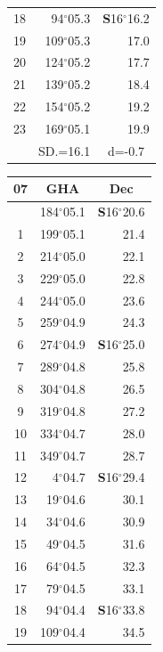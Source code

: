 \documentclass[10pt, a4paper]{report}
\begin{document}
\begin{scriptsize}
\begin{tabular*}{0.2\textwidth}[t]{@{\extracolsep{\fill}}|c|rr|}
18 & 94$^\circ$05.3 & \textbf{S}16$^\circ$16.2\\
19 & 109$^\circ$05.3 & 17.0\\
20 & 124$^\circ$05.2 & 17.7\\
21 & 139$^\circ$05.2 & \raisebox{0.24ex}{\boldmath$\cdot$~\boldmath$\cdot$~~}18.4\\
22 & 154$^\circ$05.2 & 19.2\\
23 & 169$^\circ$05.1 & 19.9\\
\hline
\rule{0pt}{2.4ex} & \multicolumn{1}{c}{SD.=16.1} & \multicolumn{1}{c|}{d=-0.7}\\
\hline
\end{tabular*}\noindent
\begin{tabular*}{0.2\textwidth}[t]{@{\extracolsep{\fill}}|c|rr|}
\hline
\multicolumn{1}{|c|}{\rule{0pt}{2.6ex}\textbf{07}} & \multicolumn{1}{c}{\textbf{GHA}} & \multicolumn{1}{c|}{\textbf{Dec}}\\
\hline\rule{0pt}{2.6ex}\noindent
0 & 184$^\circ$05.1 & \textbf{S}16$^\circ$20.6\\
1 & 199$^\circ$05.1 & 21.4\\
2 & 214$^\circ$05.0 & 22.1\\
3 & 229$^\circ$05.0 & \raisebox{0.24ex}{\boldmath$\cdot$~\boldmath$\cdot$~~}22.8\\
4 & 244$^\circ$05.0 & 23.6\\
5 & 259$^\circ$04.9 & 24.3\\[2Pt]
6 & 274$^\circ$04.9 & \textbf{S}16$^\circ$25.0\\
7 & 289$^\circ$04.8 & 25.8\\
8 & 304$^\circ$04.8 & 26.5\\
9 & 319$^\circ$04.8 & \raisebox{0.24ex}{\boldmath$\cdot$~\boldmath$\cdot$~~}27.2\\
10 & 334$^\circ$04.7 & 28.0\\
11 & 349$^\circ$04.7 & 28.7\\[2Pt]
12 & 4$^\circ$04.7 & \textbf{S}16$^\circ$29.4\\
13 & 19$^\circ$04.6 & 30.1\\
14 & 34$^\circ$04.6 & 30.9\\
15 & 49$^\circ$04.5 & \raisebox{0.24ex}{\boldmath$\cdot$~\boldmath$\cdot$~~}31.6\\
16 & 64$^\circ$04.5 & 32.3\\
17 & 79$^\circ$04.5 & 33.1\\[2Pt]
18 & 94$^\circ$04.4 & \textbf{S}16$^\circ$33.8\\
19 & 109$^\circ$04.4 & 34.5\\

\end{tabular*}
\end{scriptsize}
\end{document}
